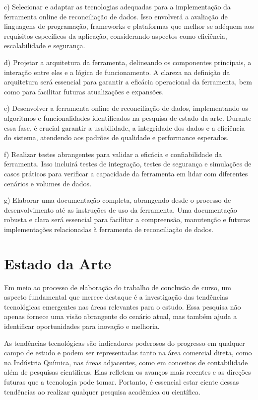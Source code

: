c) Selecionar e adaptar as tecnologias adequadas para a implementação da ferramenta online de reconciliação de dados. Isso envolverá a avaliação de linguagens de programação, frameworks e plataformas que melhor se adéquem aos requisitos específicos da aplicação, considerando aspectos como eficiência, escalabilidade e segurança.

d) Projetar a arquitetura da ferramenta, delineando os componentes principais, a interação entre eles e a lógica de funcionamento. A clareza na definição da arquitetura será essencial para garantir a eficácia operacional da ferramenta, bem como para facilitar futuras atualizações e expansões.

e) Desenvolver a ferramenta online de reconciliação de dados, implementando os algoritmos e funcionalidades identificados na pesquisa de estado da arte. Durante essa fase, é crucial garantir a usabilidade, a integridade dos dados e a eficiência do sistema, atendendo aos padrões de qualidade e performance esperados.

f) Realizar testes abrangentes para validar a eficácia e confiabilidade da ferramenta. Isso incluirá testes de integração, testes de segurança e simulações de casos práticos para verificar a capacidade da ferramenta em lidar com diferentes cenários e volumes de dados.

g) Elaborar uma documentação completa, abrangendo desde o processo de desenvolvimento até as instruções de uso da ferramenta. Uma documentação robusta e clara será essencial para facilitar a compreensão, manutenção e futuras implementações relacionadas à ferramenta de reconciliação de dados.

\section{Estado da Arte}

Em meio ao processo de elaboração do trabalho de conclusão de curso, um aspecto fundamental que merece destaque é a investigação das tendências tecnológicas emergentes nas áreas relevantes para o estudo. Essa pesquisa não apenas fornece uma visão abrangente do cenário atual, mas também ajuda a identificar oportunidades para inovação e melhoria.

As tendências tecnológicas são indicadores poderosos do progresso em qualquer campo de estudo e podem ser representadas tanto na área comercial direta, como na Indústria Química, nas áreas adjacentes, como em conceitos de contabilidade além de pesquisas cientificas. Elas refletem os avanços mais recentes e as direções futuras que a tecnologia pode tomar. Portanto, é essencial estar ciente dessas tendências ao realizar qualquer pesquisa acadêmica ou científica.

